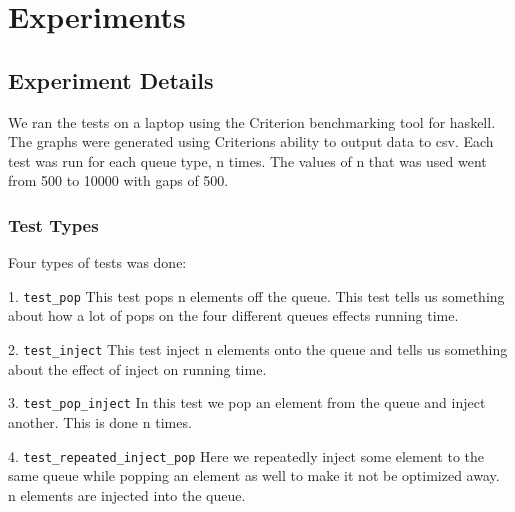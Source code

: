 \section{Experiments}
\subsection{Experiment Details}
We ran the tests on a laptop using the Criterion benchmarking tool for haskell. The graphs were generated using Criterions ability to output data to csv. Each test was run for each queue type, n times. The values of n that was used went from 500 to 10000 with gaps of 500.

\subsubsection{Test Types}
Four types of tests was done:
\begin{description}
\item{1. \texttt{test\_pop}}
This test pops n elements off the queue. This test tells us something about how a lot of pops on the four different queues effects running time.
\item{2. \texttt{test\_inject}}
This test inject n elements onto the queue and tells us something about the effect of inject on running time.
\item{3. \texttt{test\_pop\_inject}}
In this test we pop an element from the queue and inject another. This is done n times.
\item{4. \texttt{test\_repeated\_inject\_pop}}
Here we repeatedly inject some element to the same queue while popping an element as well to make it not be optimized away. n elements are injected into the queue.
\end{description}



